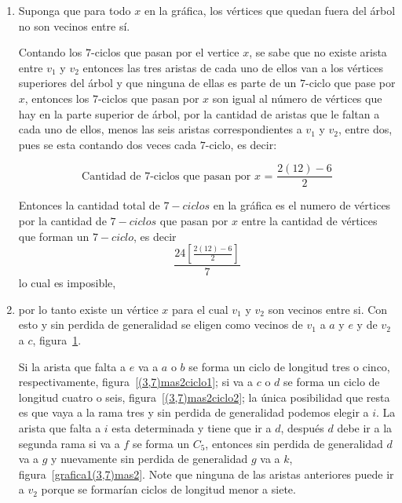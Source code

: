 \documentclass[11pt]{book}
\theoremstyle{definition}
\begin{document}
\begin{enumerate}
\item Suponga que para todo $x$ en la gráfica, los vértices que quedan
fuera del árbol no son vecinos entre sí.


 Contando los
$7$-ciclos que pasan por el vertice $x$, se sabe que no existe arista entre $v_1$
y $v_2$ entonces las tres aristas de cada uno de ellos van a los
vértices superiores del árbol y que ninguna de ellas es parte de un
$7$-ciclo que pase por $x$, entonces los $7$-ciclos que pasan por $x$
son igual al número de vértices que hay en la parte superior de árbol,
por la cantidad de aristas que le faltan a cada uno de ellos, menos
las seis aristas correspondientes a $v_1$ y $v_2$, entre dos, pues se
esta contando dos veces cada $7$-ciclo, es decir:

\begin{equation*}
  \text{Cantidad de $7$-ciclos que pasan por $x$ = } \frac{2(12)-6}{2}
\end{equation*}

Entonces la cantidad total de $7-ciclos$ en la gráfica es el numero de
vértices por la cantidad de $7-ciclos$ que pasan por $x$ entre la
cantidad de vértices que forman un $7-ciclo$, es decir
$$\frac{24[\frac{2(12)-6}{2}]}{7}$$ lo cual es imposible, 

\item
por lo tanto
existe un vértice $x$ para el cual $v_1$ y $v_2$ son vecinos entre
si. Con esto y sin perdida de generalidad se eligen como vecinos de
$v_1$ a $a$ y $e$ y de $v_2$ a $c$, figura~\ref{grafica(3,7)mas2}.



\begin{figure}
  \centering
  \caption{} \label{grafica(3,7)mas2}
\end{figure}


Si la arista que falta a $e$ va a $a$ o $b$ se forma un ciclo de
longitud tres o cinco, respectivamente, figura~\ref{(3,7)mas2ciclo1};
si va a $c$ o $d$ se forma un ciclo de longitud cuatro o seis,
figura~\ref{(3,7)mas2ciclo2}; la única posibilidad que resta es que
vaya a la rama tres y sin perdida de generalidad podemos elegir a
$i$. La arista que falta a $i$ esta determinada y tiene que ir a $d$,
después $d$ debe ir a la segunda rama si va a $f$ se forma un $C_5$,
entonces sin perdida de generalidad $d$ va a $g$ y nuevamente sin
perdida de generalidad $g$ va a $k$,
figura~\ref{grafica1(3,7)mas2}. Note que ninguna de las aristas
anteriores puede ir a $v_2$ porque se formarían ciclos de longitud
menor a siete.



\end{enumerate}
\end{document}

